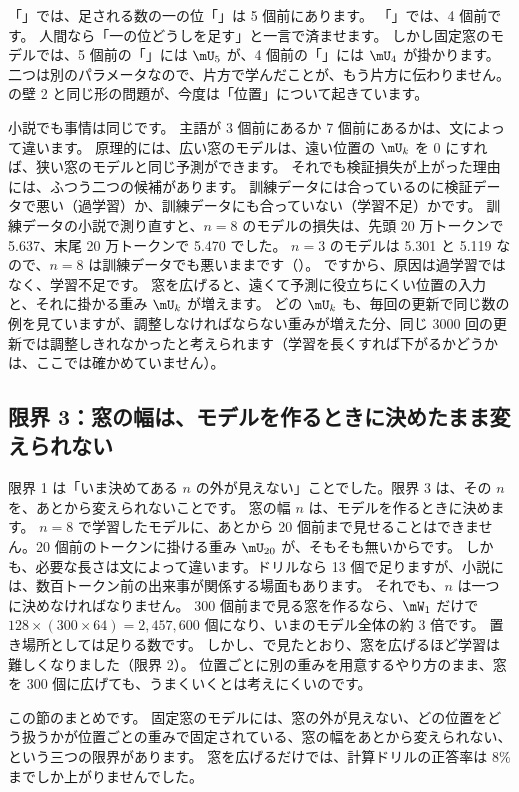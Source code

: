 「」では、足される数の一の位「」は 5 個前にあります。
「」では、4 個前です。
人間なら「一の位どうしを足す」と一言で済ませます。
しかし固定窓のモデルでは、5 個前の「」には $\mU_5$ が、4 個前の「」には $\mU_4$ が掛かります。
二つは別のパラメータなので、片方で学んだことが、もう片方に伝わりません。
の壁 2 と同じ形の問題が、今度は「位置」について起きています。

小説でも事情は同じです。
主語が 3 個前にあるか 7 個前にあるかは、文によって違います。
原理的には、広い窓のモデルは、遠い位置の $\mU_k$ を 0 にすれば、狭い窓のモデルと同じ予測ができます。
それでも検証損失が上がった理由には、ふつう二つの候補があります。
訓練データには合っているのに検証データで悪い（過学習）か、訓練データにも合っていない（学習不足）かです。
訓練データの小説で測り直すと、$n=8$ のモデルの損失は、先頭 20 万トークンで 5.637、末尾 20 万トークンで 5.470 でした。
$n=3$ のモデルは 5.301 と 5.119 なので、$n=8$ は訓練データでも悪いままです（）。
ですから、原因は過学習ではなく、学習不足です。
窓を広げると、遠くて予測に役立ちにくい位置の入力と、それに掛かる重み $\mU_k$ が増えます。
どの $\mU_k$ も、毎回の更新で同じ数の例を見ていますが、調整しなければならない重みが増えた分、同じ 3000 回の更新では調整しきれなかったと考えられます（学習を長くすれば下がるかどうかは、ここでは確かめていません）。

\subsection*{限界 3：窓の幅は、モデルを作るときに決めたまま変えられない}

限界 1 は「いま決めてある $n$ の外が見えない」ことでした。限界 3 は、その $n$ を、あとから変えられないことです。
窓の幅 $n$ は、モデルを作るときに決めます。
$n=8$ で学習したモデルに、あとから 20 個前まで見せることはできません。20 個前のトークンに掛ける重み $\mU_{20}$ が、そもそも無いからです。
しかも、必要な長さは文によって違います。ドリルなら 13 個で足りますが、小説には、数百トークン前の出来事が関係する場面もあります。
それでも、$n$ は一つに決めなければなりません。
300 個前まで見る窓を作るなら、$\mW_1$ だけで $128\times(300\times64)=2{,}457{,}600$ 個になり、いまのモデル全体の約 3 倍です。
置き場所としては足りる数です。
しかし、で見たとおり、窓を広げるほど学習は難しくなりました（限界 2）。
位置ごとに別の重みを用意するやり方のまま、窓を 300 個に広げても、うまくいくとは考えにくいのです。

この節のまとめです。
固定窓のモデルには、窓の外が見えない、どの位置をどう扱うかが位置ごとの重みで固定されている、窓の幅をあとから変えられない、という三つの限界があります。
窓を広げるだけでは、計算ドリルの正答率は 8\% までしか上がりませんでした。

